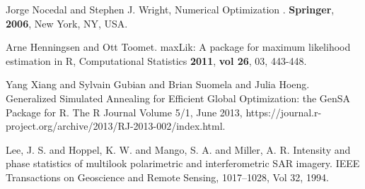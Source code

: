 \documentclass[remotesensing,article,submit,moreauthors,pdftex]{Definitions/mdpi}
\begin{document}


%

\begin{thebibliography}{999}
Jorge Nocedal and Stephen J. Wright, Numerical Optimization . {\bf Springer}, {\bf 2006}, New York, NY, USA.


Arne Henningsen and Ott Toomet. maxLik: A package for maximum likelihood estimation in {R}, Computational Statistics {\bf 2011}, {\bf vol 26}, 03, 443-448.

Yang Xiang and Sylvain Gubian and Brian Suomela and Julia Hoeng. Generalized Simulated Annealing for Efficient Global Optimization: the {GenSA} Package for {R}. The R Journal Volume 5/1, June 2013, https://journal.r-project.org/archive/2013/RJ-2013-002/index.html.

Lee, J. S. and Hoppel, K. W. and Mango, S. A. and Miller, A. R. Intensity and phase statistics of multilook polarimetric and interferometric {SAR} imagery. IEEE Transactions on Geoscience and Remote Sensing, 1017--1028, Vol 32, 1994.
  
 

\end{thebibliography}

\end{document}
